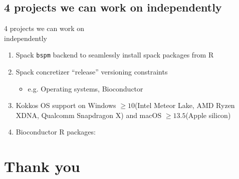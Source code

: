 \documentclass[
aspectratio=169,
xcolor={usenames}
]{beamer}
\begin{document}
\subsection{4 projects we can work on independently}
\begin{frame}{\hspace{8cm}4 projects we can work on\\%
    \hspace{8cm}independently}
  \begin{enumerate}[<+->]
  \item Spack \texttt{bspm} backend to seamlessly install spack packages from R
  \item Spack concretizer ``release'' versioning constraints
    \begin{itemize}[<.->]
    \item e.g. Operating systems, Bioconductor
    \end{itemize}
  \item Kokkos OS support on %
    Windows $\ge 10$\footnotemark[1]
    (Intel Meteor Lake, AMD Ryzen XDNA, Qualcomm Snapdragon X) and %
    macOS $\ge 13.5$\footnotemark[2]
    (Apple silicon)
  \item Bioconductor R packages\footnotemark[3]:
  \end{enumerate}
\end{frame}

\section{Thank you}
\end{document}
